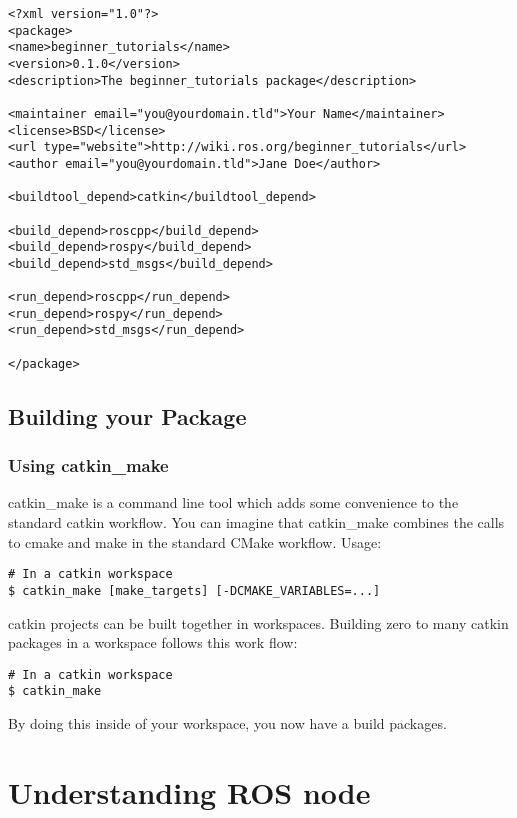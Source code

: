 \begin{lstlisting}[breaklines=true languages=xml]
<?xml version="1.0"?>
<package>
<name>beginner_tutorials</name>
<version>0.1.0</version>
<description>The beginner_tutorials package</description>

<maintainer email="you@yourdomain.tld">Your Name</maintainer>
<license>BSD</license>
<url type="website">http://wiki.ros.org/beginner_tutorials</url>
<author email="you@yourdomain.tld">Jane Doe</author>

<buildtool_depend>catkin</buildtool_depend>

<build_depend>roscpp</build_depend>
<build_depend>rospy</build_depend>
<build_depend>std_msgs</build_depend>

<run_depend>roscpp</run_depend>
<run_depend>rospy</run_depend>
<run_depend>std_msgs</run_depend>

</package>
\end{lstlisting}
\pagebreak
\newpage

\subsection{Building your Package}
\subsubsection{Using catkin\_make}
catkin\_make is a command line tool which adds some convenience to the standard catkin workflow. You can imagine that catkin\_make combines the calls to cmake and make in the standard CMake workflow.
\newline
\newline
Usage:
\begin{lstlisting}[breaklines=true languages=bash]
# In a catkin workspace
$ catkin_make [make_targets] [-DCMAKE_VARIABLES=...]
\end{lstlisting}

\noindent catkin projects can be built together in workspaces. Building zero to many catkin packages in a workspace follows this work flow:

\begin{lstlisting}[breaklines=true languages=bash]
# In a catkin workspace
$ catkin_make
\end{lstlisting}

By doing this inside of your workspace, you now have a build packages.

\section{Understanding ROS node}

